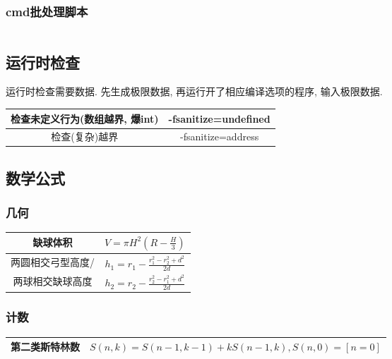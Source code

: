 \documentclass[utf8]{ctexart}
\begin{document}
\subsubsection{cmd批处理脚本}
\inputminted[linenos,breaklines,tabsize=4,mathescape,texcl]{bat}{codes/check-bat.bat}

\subsection{运行时检查}

运行时检查需要数据. 先生成极限数据, 再运行开了相应编译选项的程序, 输入极限数据.

\begin{spacing}{2}
\begin{center}
\begin{tabular}{ |c|c| }
	\hline
	检查未定义行为(数组越界, 爆int)	& -fsanitize=undefined		\\
	\hline
	检查(复杂)越界					& -fsanitize=address		\\
	\hline
\end{tabular}
\end{center}
\end{spacing}

\subsection{数学公式}

\subsubsection{几何}

\begin{spacing}{2}
\begin{center}
\begin{tabular}{ |c|c| }
	\hline
	缺球体积				& $V = \pi H^2\left(R-\frac{H}{3}\right)$		\\
	\hline
	两圆相交弓型高度/		& $h_1 = r_1 - \frac{r_1^2 - r_2^2 + d^2}{2d}$	\\
	两球相交缺球高度		& $h_2 = r_2 - \frac{r_2^2 - r_1^2 + d^2}{2d}$	\\
	\hline
\end{tabular}
\end{center}
\end{spacing}

\subsubsection{计数}

\begin{spacing}{2}
\begin{center}
\begin{tabular}{ |c|c| }
	\hline
	第二类斯特林数				& $S(n, k) = S(n-1, k-1) + k S(n-1, k), S(n, 0) = [n = 0]$		\\
	\hline
\end{tabular}
\end{center}
\end{spacing}
\end{document}
